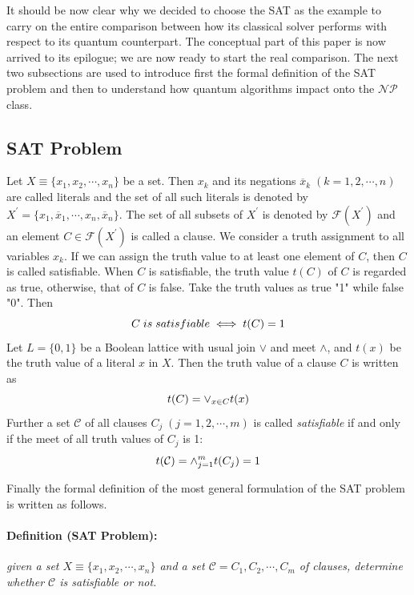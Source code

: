 \documentclass[english]{article}
\begin{document}
			 It should be now clear why we decided to choose the SAT as the example to carry on the entire comparison between how its classical solver performs with respect to its quantum counterpart. The conceptual part of this paper is now arrived to its epilogue; we are now ready to start the real comparison. The next two subsections are used to introduce first the formal definition of the SAT problem and then to understand how quantum algorithms impact onto the $\mathcal{N}\mathcal{P}$ class.
		
		\subsection{SAT Problem}
		\label{sec:sat}
			Let $X\equiv\{x_1, x_2, \cdots, x_n\}$ be a set. Then $x_k$ and its negations $\overline{x}_k\;(k=1, 2, \cdots, n)$ are called literals and the set of all such literals is denoted by $X^{'}=\{x_1,\overline{x}_1,\cdots, x_n, \overline{x}_n\}$. The set of all subsets of $X^{'}$ is denoted by $\mathcal{F}(X^{'})$ and an element $C\in\mathcal{F}(X^{'})$ is called a clause. We consider a truth assignment to all variables $x_k$. If we can assign the truth value to at least one element of $C$, then $C$ is called satisfiable. When $C$ is satisfiable, the truth value $t(C)$ of $C$ is regarded as true, otherwise, that of $C$ is false. Take the truth values as true "1" while false "0". Then 
			\begin{equation*}
				\centering
				C\;is\;satisfiable\iff t(C)=1
			\end{equation*}
			Let $L=\{0,1\}$ be a Boolean lattice with usual join $\lor$ and meet $\land$, and $t(x)$ be the truth value of a literal $x$ in $X$. Then the truth value of a clause $C$ is written as
			\begin{equation*}
				\centering
				t(C) = \lor_{x\in C}t(x) 
			\end{equation*}
			Further  a set $\mathcal{C}$ of all clauses $C_j\;(j = 1, 2, \cdots, m)$ is called \emph{satisfiable} if and only if the meet of all truth values of $C_j$ is 1:
			\begin{equation*}
				\centering
				t(\mathcal{C}) = \land_{j = 1}^{m}t(C_j) = 1 
			\end{equation*}
			
			Finally the formal definition of the most general formulation of the SAT problem is written as follows.
			
			\paragraph{Definition (SAT Problem):} \emph{given a set $X\equiv \{x_1,x_2,\cdots,x_n\}$ and a set $\mathcal{C}={C_1,C_2,\cdots,C_m}$ of clauses, determine whether $\mathcal{C}$ is satisfiable or not.} \\
			
\end{document}
